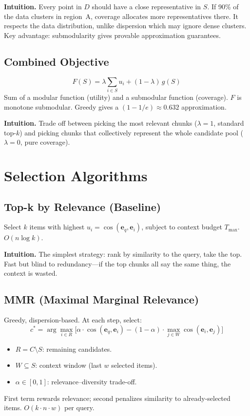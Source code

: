 \documentclass[11pt,a4paper]{article}
\begin{document}
\textbf{Intuition.} Every point in $D$ should have a close representative in $S$. If 90\% of the data clusters in region~A, coverage allocates more representatives there. It respects the data distribution, unlike dispersion which may ignore dense clusters. Key advantage: submodularity gives provable approximation guarantees.

\subsection{Combined Objective}

\[
	F(S) = \lambda \sum_{i \in S} u_i + (1-\lambda)\, g(S)
\]
Sum of a modular function (utility) and a submodular function (coverage). $F$ is monotone submodular. Greedy gives a $(1 - 1/e) \approx 0.632$ approximation.

\textbf{Intuition.} Trade off between picking the most relevant chunks ($\lambda = 1$, standard top-$k$) and picking chunks that collectively represent the whole candidate pool ($\lambda = 0$, pure coverage).

\section{Selection Algorithms}

\subsection{Top-k by Relevance (Baseline)}

Select $k$ items with highest $u_i = \cos(\mathbf{e}_q, \mathbf{e}_i)$, subject to context budget $T_{\max}$. $O(n \log k)$.

\textbf{Intuition.} The simplest strategy: rank by similarity to the query, take the top. Fast but blind to redundancy---if the top chunks all say the same thing, the context is wasted.

\subsection{MMR (Maximal Marginal Relevance)}

Greedy, dispersion-based. At each step, select:
\[
	c^* = \arg\max_{i \in R} \Big[ \alpha \cdot \cos(\mathbf{e}_q, \mathbf{e}_i) - (1-\alpha) \cdot \max_{j \in W} \cos(\mathbf{e}_i, \mathbf{e}_j) \Big]
\]
\begin{itemize}
	\item $R = C \setminus S$: remaining candidates.
	\item $W \subseteq S$: context window (last $w$ selected items).
	\item $\alpha \in [0,1]$: relevance--diversity trade-off.
\end{itemize}
First term rewards relevance; second penalizes similarity to already-selected items. $O(k \cdot n \cdot w)$ per query.
\end{document}
